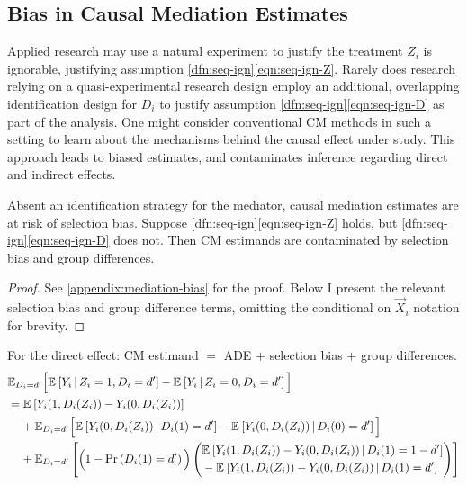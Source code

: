 \subsection{Bias in Causal Mediation Estimates}
Applied research may use a natural experiment to justify the treatment $Z_i$ is ignorable, justifying assumption \ref{dfn:seq-ign}\eqref{eqn:seq-ign-Z}.
Rarely does research relying on a quasi-experimental research design employ an additional, overlapping identification design for $D_i$ to justify assumption \ref{dfn:seq-ign}\eqref{eqn:seq-ign-D} as part of the analysis.
One might consider conventional CM methods in such a setting to learn about the mechanisms behind the causal effect under study.
This approach leads to biased estimates, and contaminates inference regarding direct and indirect effects.%

\begin{theorem}
    \label{thm:selection-bias}
    Absent an identification strategy for the mediator, causal mediation estimates are at risk of selection bias.
    Suppose \ref{dfn:seq-ign}\eqref{eqn:seq-ign-Z} holds, but \ref{dfn:seq-ign}\eqref{eqn:seq-ign-D} does not.
    Then CM estimands are contaminated by selection bias and group differences.
\end{theorem}
\begin{proof}
    See \autoref{appendix:mediation-bias} for the proof.
    Below I present the relevant selection bias and group difference terms, omitting the conditional on $\vec X_i$ notation for brevity.
\end{proof}

\noindent
For the direct effect: CM estimand $=$ ADE $+$ selection bias $+$ group differences.
\begin{align*}
    & \mathbb E_{D_i = d'} \Big[
        \Egiven{Y_i}{Z_i = 1, D_i = d'} - \Egiven{Y_i}{Z_i = 0, D_i = d'} \Big] \\
    & = \E{Y_i(1, D_i(Z_i)) - Y_i(0, D_i(Z_i))} \\
    & \;\;\;\; + \mathbb E_{D_i = d'} \Big[
        \Egiven{Y_i(0, D_i(Z_i))}{D_i(1) = d'} 
        - \Egiven{Y_i(0, D_i(Z_i))}{D_i(0) = d'} \Big] \\
    & \;\;\;\; + \E[D_i = d']{
        \Big(1 - \Prob{D_i(1) = d'} \Big)
        \left( \begin{aligned}
            &\Egiven{Y_i(1, D_i(Z_i)) - Y_i(0, D_i(Z_i))}{D_i(1) = 1-d'} \\ 
            &  - \Egiven{Y_i(1, D_i(Z_i)) - Y_i(0, D_i(Z_i))}{D_i(1) = d'}
            \end{aligned} \right) }
\end{align*}

